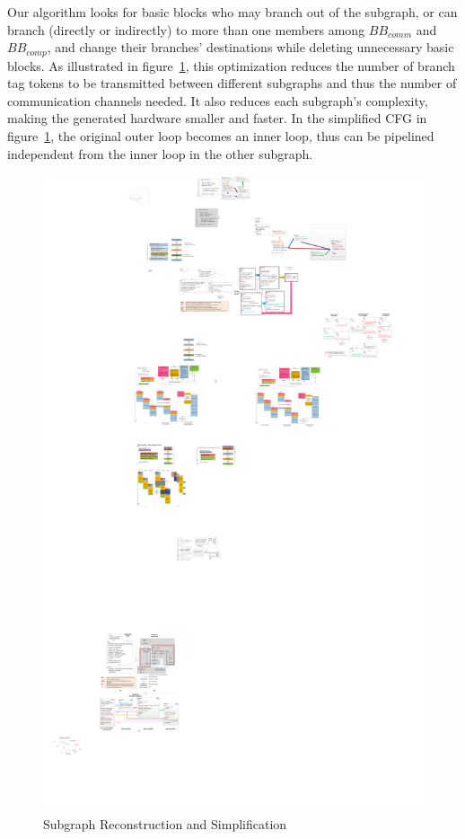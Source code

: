 Our algorithm looks for basic blocks who may branch out of the subgraph, or can branch (directly
or indirectly)
to more than one members among $BB_{comm}$ and  $BB_{comp}$, and 
change their branches' destinations while deleting unnecessary basic blocks. As illustrated in figure~\ref{fig:cfsim}, this optimization reduces the number of branch tag tokens to be transmitted
between different subgraphs and thus the number of communication channels
needed. It also reduces each subgraph's complexity, making the generated hardware smaller and faster. 
In the simplified CFG in figure~\ref{fig:cfsim}, the original outer loop becomes
an inner loop, thus can be pipelined independent from the inner loop in the
other subgraph.

\begin{figure}[htp]
\begin{center}
\includegraphics[width=1.0\linewidth]{chap3fig/cfgRecSim.pdf}
\caption{Subgraph Reconstruction and Simplification 
\label{fig:cfsim}}
\end{center}
\end{figure}

